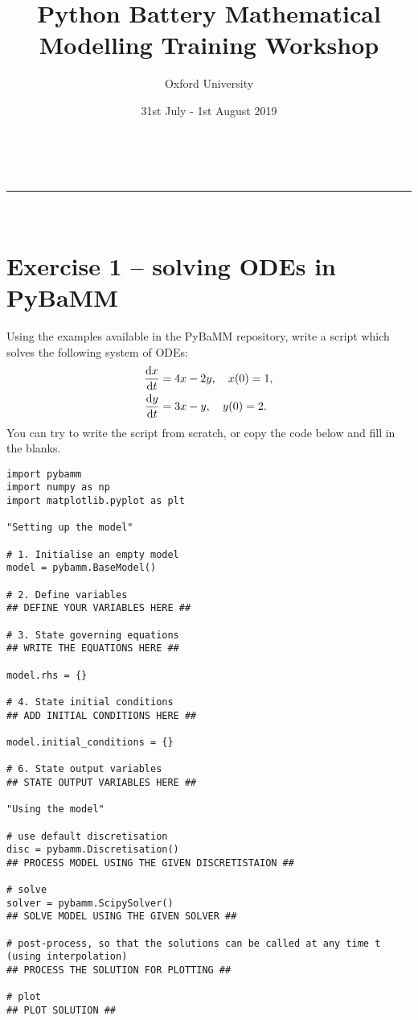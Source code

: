\documentclass[a4paper,11pt]{article}
\makeatletter
\newcommand{\linia}{\rule{\linewidth}{0.5pt}}
\renewcommand{\maketitle}{
\begin{center}
\vspace{2ex}
{\huge \textsc{\@title}}
\vspace{1ex}
\\
\linia\\
\@author \hfill \@date
\vspace{4ex}
\end{center}
}
\makeatother
\begin{document}
\title{\textbf{P}ython \textbf{Ba}ttery \textbf{M}athematical \textbf{M}odelling Training Workshop}

\author{Oxford University}

\date{31st July - 1st August 2019}

\maketitle

\section*{Exercise 1 -- solving ODEs in PyBaMM}

Using the examples available in the PyBaMM repository, write a script which solves the following system of ODEs:
\begin{align*}
  \dv{x}{t} &= 4x - 2y, \quad x(0) = 1, \\
  \dv{y}{t} &= 3x - y, \quad y(0) = 2.
\end{align*}
You can try to write the script from scratch, or copy the code below and fill in the blanks.


\begin{lstlisting}[label={Ex1},caption=Solving ODEs script]
import pybamm
import numpy as np
import matplotlib.pyplot as plt

"Setting up the model"

# 1. Initialise an empty model
model = pybamm.BaseModel()

# 2. Define variables
## DEFINE YOUR VARIABLES HERE ##

# 3. State governing equations
## WRITE THE EQUATIONS HERE ##

model.rhs = {}

# 4. State initial conditions
## ADD INITIAL CONDITIONS HERE ##

model.initial_conditions = {}

# 6. State output variables
## STATE OUTPUT VARIABLES HERE ##

"Using the model"

# use default discretisation
disc = pybamm.Discretisation()
## PROCESS MODEL USING THE GIVEN DISCRETISTAION ##

# solve
solver = pybamm.ScipySolver()
## SOLVE MODEL USING THE GIVEN SOLVER ##

# post-process, so that the solutions can be called at any time t (using interpolation)
## PROCESS THE SOLUTION FOR PLOTTING ##

# plot
## PLOT SOLUTION ##
\end{lstlisting}
\end{document}
